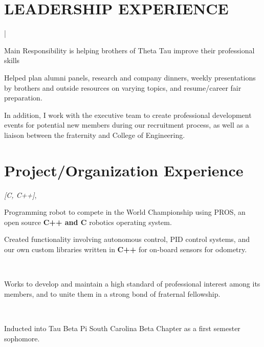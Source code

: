 \documentclass[letterpaper]{deedy-resume}
\begin{document}
\begin{minipage}[t]{0.69\textwidth}
\sectionspace

\section{LEADERSHIP EXPERIENCE}

 |

\begin{tightitemize}
\item Main Responsibility is helping brothers of Theta Tau improve their professional skills
\item Helped plan alumni panels, research and company dinners, weekly presentations by brothers and outside resources on varying topics, and resume/career fair preparation.
\item In addition, I work with the executive team to create professional development events for potential new members during our recruitment process, as well as a liaison between the fraternity and College of Engineering.
\end{tightitemize}

\sectionspace 

\section{Project/Organization Experience}

 \emph{[C, C++]}, \\
\begin{tightitemize}
\item Programming robot to compete in the World Championship using PROS, an open source \textbf{C++ and C} robotics operating system. 
\item Created functionality involving autonomous control, PID control systems, and our own custom libraries written in \textbf{C++} for on-board sensors for odometry.
\end{tightitemize}
\sectionspace 

 \\
\begin{tightitemize}
\item Works to develop and maintain a high standard of professional interest among its members, and to unite them in a strong bond of fraternal fellowship. 
\end{tightitemize}
\sectionspace 

  \\
\begin{tightitemize}
\item Inducted into Tau Beta Pi South Carolina Beta Chapter as a first semester sophomore.
\end{tightitemize}
\sectionspace 

\end{minipage}
\end{document}
